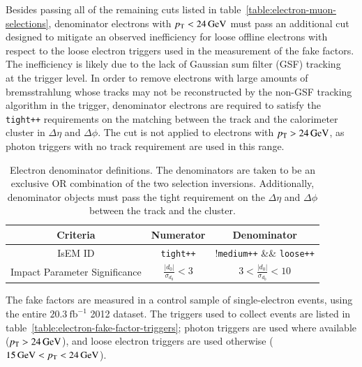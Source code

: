 Besides passing all of the remaining cuts listed in table~\ref{table:electron-muon-selections}, denominator electrons with $p_{\text{T}}<\SI{24}{\giga\electronvolt}$ must pass an additional cut designed to mitigate an observed inefficiency for loose offline electrons with respect to the loose electron triggers used in the measurement of the fake factors. The inefficiency is likely due to the lack of Gaussian sum filter (GSF) tracking~\cite{TheATLASCollaboration:2012vr} at the trigger level. In order to remove electrons with large amounts of bremsstrahlung whose tracks may not be reconstructed by the non-GSF tracking algorithm in the trigger, denominator electrons are required to satisfy the \texttt{tight++} requirements on the matching between the track and the calorimeter cluster in $\Delta \eta$ and $\Delta \phi$. The cut is not applied to electrons with $p_{\text{T}}>\SI{24}{\giga\electronvolt}$, as photon triggers with no track requirement are used in this range. 


\begin{table}[h]
  \centering
  \begin{tabular}{ccc}
	\hline
	Criteria & Numerator & Denominator \\ \hline
	IsEM ID & \texttt{tight++} & !\texttt{medium++} \&\& \texttt{loose++}  \\
	Impact Parameter Significance & $\frac{|d_0|}{\sigma_{d_0}} < 3$ & $3 < \frac{|d_0|}{\sigma_{d_0}} < 10$ \\
	\hline
  \end{tabular}
  \caption{Electron denominator definitions. The denominators are taken to be an exclusive OR combination of the two selection inversions. Additionally, denominator objects must pass the tight requirement on the $\Delta\eta$ and $\Delta\phi$ between the track and the cluster.}
  \label{table:electron-denominator-definition}
\end{table}

The fake factors are measured in a control sample of single-electron events, using the entire $\SI{20.3}{\femto\barn\tothe{-1}}$ 2012 dataset. The triggers used to collect events are listed in table~\ref{table:electron-fake-factor-triggers}; photon triggers are used where available ($p_{\text{T}}>\SI{24}{\giga\electronvolt}$), and loose electron triggers are used otherwise ($\SI{15}{\giga\electronvolt}<p_{\text{T}}<\SI{24}{\giga\electronvolt}$). 

